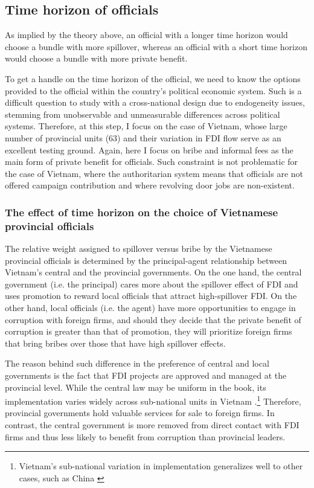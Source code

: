 \subsection{Time horizon of officials}

As implied by the theory above, an official with a longer time horizon would choose a bundle with more spillover, whereas an official with a short time horizon would choose a bundle with more private benefit.

To get a handle on the time horizon of the official, we need to know the options provided to the official within the country's political economic system. Such is a difficult question to study with a cross-national design due to endogeneity issues, stemming from unobservable and unmeasurable differences across political systems. Therefore, at this step, I focus on the case of Vietnam, whose large number of provincial units (63) and their variation in FDI flow serve as an excellent testing ground. Again, here I focus on bribe and informal fees as the main form of private benefit for officials. Such constraint is not problematic for the case of Vietnam, where the authoritarian system means that officials are not offered campaign contribution and where revolving door jobs are non-existent.

\subsubsection{The effect of time horizon on the choice of Vietnamese provincial officials} 

The relative weight assigned to spillover versus bribe by the Vietnamese provincial officials is determined by the principal-agent relationship between Vietnam's central and the provincial governments. On the one hand, the central government (i.e. the principal) cares more about the spillover effect of FDI and uses promotion to reward local officials that attract high-spillover FDI. On the other hand, local officials (i.e. the agent) have more opportunities to engage in corruption with foreign firms, and should they decide that the private benefit of corruption is greater than that of promotion, they will prioritize foreign firms that bring bribes over those that have high spillover effects.

The reason behind such difference in the preference of central and local governments is the fact that FDI projects are approved and managed at the provincial level. While the central law may be uniform in the book, its implementation varies widely across sub-national units in Vietnam \citep{Meyer2005}.\footnote{Vietnam's sub-national variation in implementation generalizes well to other cases, such as China \citep{Thun2006}} Therefore, provincial governments hold valuable services for sale to foreign firms. In contrast, the central government is more removed from direct contact with FDI firms and thus less likely to benefit from corruption than provincial leaders. 

